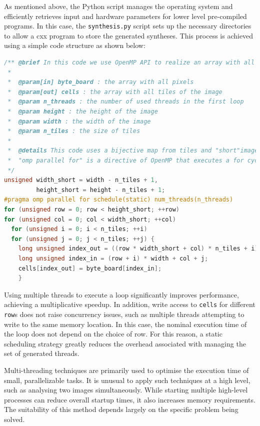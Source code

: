 \begin{toReview}
    \noindent As mentioned above, the \gls{Python} script manages the operating system and efficiently retrieves input and hardware parameters for lower level pre-compiled programs. In this case, the \texttt{synthesis.py} script sets up the necessary directories to allow a \gls{cxx} program to store the generated syntheses. This process is achieved using a simple code structure as shown below:

\newpage
\begin{lstlisting}[style=code, language=C, rulecolor=\color{blue}]
/** @brief In this code we use OpenMP API to realize an array with all tiles.
 *
 *  @param[in] byte_board : the array with all pixels
 *  @param[out] cells : the array with all tiles of the image
 *  @param n_threads : the number of used threads in the first loop
 *  @param height : the height of the image
 *  @param width : the width of the image
 *  @param n_tiles : the size of tiles
 *
 *  @details This code uses a bijective map from tiles and "short"image, i.e. an image with shape width_short, height_short. Each tiles will be assigned to its first pixel (up/sx).
 *  "omp parallel for" is a directive of OpenMP that executes a for cycle using more indipendent threads. In this case the schedule is "static" i.e. each thread knows in advance all its loops.
 */
unsigned width_short = width - n_tiles + 1,
         height_short = height - n_tiles + 1;
#pragma omp parallel for schedule(static) num_threads(n_threads)
for (unsigned row = 0; row < height_short; ++row)
for (unsigned col = 0; col < width_short; ++col)
  for (unsigned i = 0; i < n_tiles; ++i)
  for (unsigned j = 0; j < n_tiles; ++j) {
    long unsigned index_out = ((row * width_short + col) * n_tiles + i) * n_tiles + j; // [row-i, col-j, i,j]
    long unsigned index_in = (row + i) * width + col + j;
    cells[index_out] = byte_board[index_in];
    }\end{lstlisting}

    \noindent Using multiple \gls{thread}s to execute a loop significantly improves performance, achieving a multiplicative speedup. In addition, write access to \texttt{cells} for different \texttt{row}s does not raise concurrency issues, such as multiple \gls{thread}s attempting to write to the same memory location. In this case, the nominal execution time of the loop does not depend on the choice of row. For this reason, a static scheduling strategy greatly reduces the overhead associated with managing the set of generated threads.

    \noindent Multi-threading techniques are primarily used to optimise the execution time of small, parallelizable tasks. It is unusual to apply such techniques at a high level, such as analysing two images simultaneously. While starting multiple high-level processes can reduce overall startup times, it also increases memory requirements. The suitability of this method depends largely on the specific problem being solved.


\end{toReview}
